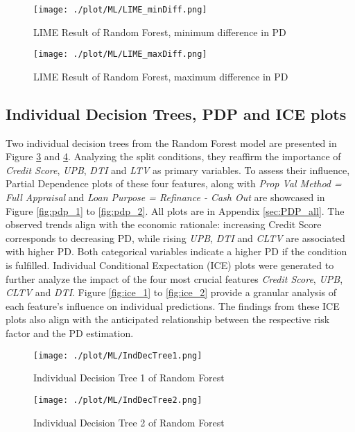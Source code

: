 \begin{figure}[H]
	\centering
	\texttt{[image: ./plot/ML/LIME\_minDiff.png]}
    \caption{LIME Result of Random Forest, minimum difference in PD}
    \label{fig:re_LIMEres_min}
\end{figure}

\begin{figure}[H]
	\centering
	\texttt{[image: ./plot/ML/LIME\_maxDiff.png]}
    \caption{LIME Result of Random Forest, maximum difference in PD}
    \label{fig:re_LIMEres_max}
\end{figure}

\subsection{Individual Decision Trees, PDP and ICE plots}
Two individual decision trees from the Random Forest model are presented in Figure \ref{fig:re_indtree1} and \ref{fig:re_indtree2}. Analyzing the split conditions, they reaffirm the importance of \emph{Credit Score}, \emph{UPB}, \emph{DTI} and \emph{LTV} as primary variables. To assess their influence, Partial Dependence plots of these four features, along with \emph{Prop Val Method = Full Appraisal} and \emph{Loan Purpose = Refinance - Cash Out} are showcased in Figure \ref{fig:pdp_1} to \ref{fig:pdp_2}. All plots are in Appendix \ref{sec:PDP_all}. The observed trends align with the economic rationale: increasing Credit Score corresponds to decreasing PD, while rising \emph{UPB}, \emph{DTI} and \emph{CLTV} are associated with higher PD. Both categorical variables indicate a higher PD if the condition is fulfilled. Individual Conditional Expectation (ICE) plots were generated to further analyze the impact of the four most crucial features \emph{Credit Score}, \emph{UPB}, \emph{CLTV} and \emph{DTI}. Figure \ref{fig:ice_1} to \ref{fig:ice_2} provide a granular analysis of each feature's influence on individual predictions. The findings from these ICE plots also align with the anticipated relationship between the respective risk factor and the PD estimation.

\begin{figure}[H]
	\centering
	\texttt{[image: ./plot/ML/IndDecTree1.png]}
    \caption{Individual Decision Tree 1 of Random Forest}
    \label{fig:re_indtree1}
\end{figure}

\begin{figure}[H]
	\centering
	\texttt{[image: ./plot/ML/IndDecTree2.png]}
    \caption{Individual Decision Tree 2 of Random Forest}
    \label{fig:re_indtree2}
\end{figure}

